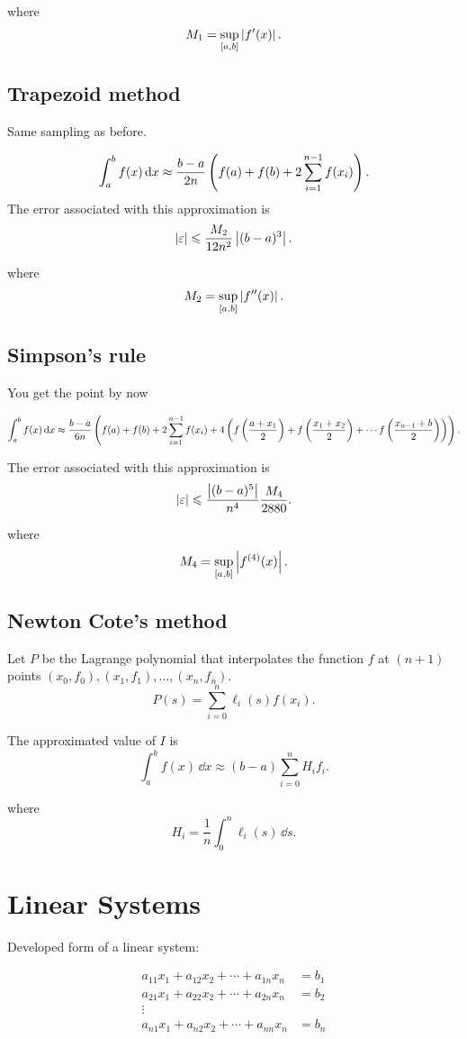\documentclass{report}
\begin{document}
where
\[
	M_1 = \sup_{[a,b]}\left|f'(x)\right|
	.\]

\section{Trapezoid method}

Same sampling as before.

\[
	\int_a^b f(x)\,\mathrm{d}x \approx \frac{b-a}{2n}\left(f(a)+f(b)+2\sum_{i=1}^{n-1}f(x_i)\right)
	.\]
The error associated with this approximation is
\[
	|\varepsilon|\leqslant \frac{M_2}{12n^2}\left|(b-a)^3\right|
	.\]

where
\[
	M_2 = \sup_{[a,b]}\left|f''(x)\right|
	.\]

\section{Simpson's rule}

You get the point by now

\[
	\int_a^b f(x)\,\mathrm{d}x \approx \frac{b-a}{6n}\left(f(a)+f(b)+2\sum_{i=1}^{n-1}f(x_i) + 4\left(
	f\left(\frac{a+x_1}{2}\right) +
	f\left(\frac{x_1+x_2}{2}\right) +
	\cdots
	f\left(\frac{x_{n-1}+b}{2}\right)
	\right)
	\right)
	.\]

The error associated with this approximation is
\[
	|\varepsilon|\leqslant \frac{\left|(b-a)^5\right|}{n^4}\frac{M_4}{2880}
	.\]

where
\[
	M_4 = \sup_{[a,b]}\left|f^{(4)}(x)\right|
	.\]


\section{Newton Cote's method}

Let $P$ be the Lagrange polynomial that interpolates the function $f$ at $(n+1)$ points $(x_0,f_0),(x_1,f_1),\dots,(x_n,f_n)$.
\[
	P(s) = \sum_{i=0}^{n}\ell_i(s)f(x_i)
	.\]

The approximated value of $I$ is
\[
	\int_a^b f(x)\,\dd{x} \approx (b-a)\sum_{i=0}^n H_i f_i
	.\]

where
\[
	H_i = \frac{1}{n}\int_0^n \ell_i(s)\,\dd{s}
	.\]

\chapter{Linear Systems}

Developed form of a linear system:

\begin{align*}
	a_{11}x_1 + a_{12}x_2 + \cdots + a_{1n}x_n & = b_1 \\
	a_{21}x_1 + a_{22}x_2 + \cdots + a_{2n}x_n & = b_2 \\
	\vdots                                     &       \\
	a_{n1}x_1 + a_{n2}x_2 + \cdots + a_{nn}x_n & = b_n
\end{align*}
\end{document}
